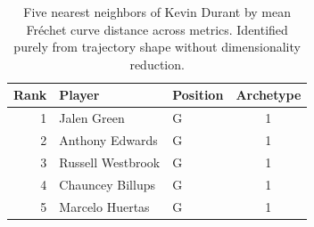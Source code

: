 \begin{table}[htbp]
  \centering\small
  \begin{tabular}{rllc}
    \toprule
    Rank & Player & Position & Archetype \\
    \midrule
    1 & Jalen Green & G & 1 \\
    2 & Anthony Edwards & G & 1 \\
    3 & Russell Westbrook & G & 1 \\
    4 & Chauncey Billups & G & 1 \\
    5 & Marcelo Huertas & G & 1 \\
    \bottomrule
  \end{tabular}
  \caption{Five nearest neighbors of Kevin Durant by mean Fr\'{e}chet curve distance across metrics. Identified purely from trajectory shape without dimensionality reduction.}
  \label{tab:Kevin_Durant_frechet_curve_neighbors}
\end{table}

